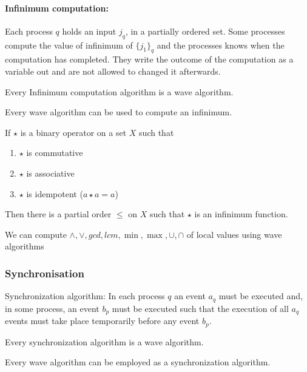 \paragraph{Infinimum computation:} Each process $q$ holds an input $j_q$, in a partially ordered set. Some processes compute the value of infinimum of $\{j_1\}_q$ and the processes knows when the computation has completed. They write the outcome of the computation as a variable out and are not allowed to changed it afterwards.

\begin{thm}
Every Infinimum computation algorithm is a wave algorithm.
\end{thm}


\begin{thm}
Every wave algorithm can be used to compute an infinimum.
\end{thm}

\begin{thm}
If $\star$ is a binary operator on a set $X$ such that
\begin{enumerate}[1.]
\item $\star$ is commutative
\item $\star$ is associative
\item $\star$ is idempotent ($a \star a = a$)
\end{enumerate}
Then there is a partial order $\leq$ on $X$ such that $\star$ is an infinimum function.
\end{thm}

\begin{coro}
We can compute $\land, \lor, gcd, lcm, \min, \max, \cup, \cap$ of local values using wave algorithms
\end{coro}

\subsubsection{Synchronisation}
Synchronization algorithm: In each process $q$ an event $a_q$ must be executed and, in some process, an event $b_p$ must be executed such that the execution of all $a_q$ events must take place temporarily before any event $b_p$.

\begin{thm}
Every synchronization algorithm is a wave algorithm.
\end{thm}

\begin{thm}
Every wave algorithm can be employed as a synchronization algorithm.
\end{thm}

